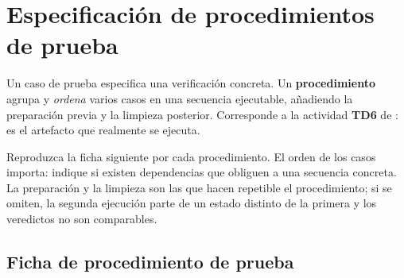 \section{Especificación de procedimientos de prueba}
\label{anx:procedimientos}

\begin{notanormativa}
Un caso de prueba especifica una verificación concreta. Un \textbf{procedimiento} agrupa y
\emph{ordena} varios casos en una secuencia ejecutable, añadiendo la preparación previa y la
limpieza posterior. Corresponde a la actividad \textbf{TD6} de : es el artefacto que
realmente se ejecuta.
\end{notanormativa}

\begin{observacion}
\end{observacion}

\begin{instruccion}
Reproduzca la ficha siguiente por cada procedimiento. El orden de los casos importa: indique si
existen dependencias que obliguen a una secuencia concreta. La preparación y la limpieza son las
que hacen repetible el procedimiento; si se omiten, la segunda ejecución parte de un estado
distinto de la primera y los veredictos no son comparables.
\end{instruccion}

\subsection*{Ficha de procedimiento de prueba}

